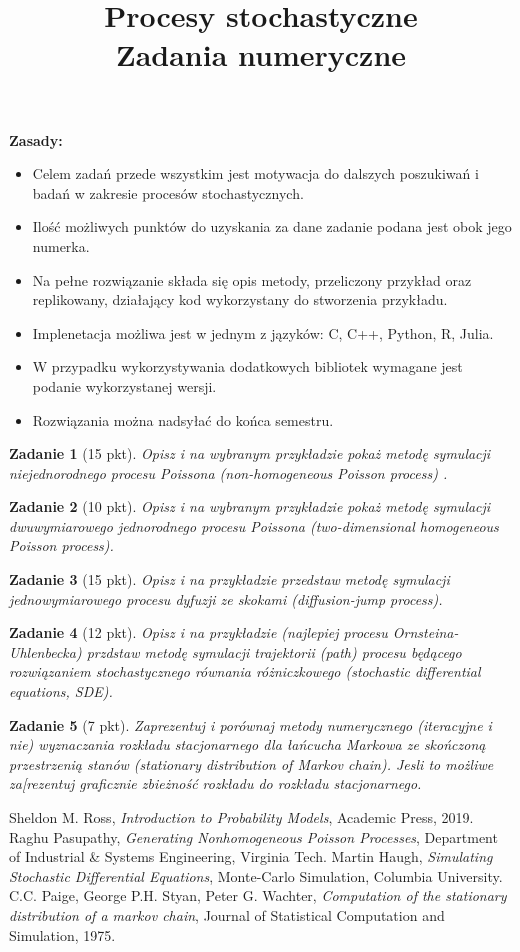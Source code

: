 \documentclass{mwart}
\title{Procesy stochastyczne \\ Zadania numeryczne}
\newtheorem{zd}{Zadanie}
\begin{document}

\maketitle
\textbf{Zasady:}
\begin{itemize}
\item Celem zadań przede wszystkim jest motywacja do dalszych poszukiwań i badań w zakresie procesów stochastycznych.
\item Ilość możliwych punktów do uzyskania za dane zadanie podana jest obok jego numerka.
\item Na pełne rozwiązanie składa się opis metody, przeliczony przykład oraz replikowany, działający kod wykorzystany do stworzenia przykładu.
\item Implenetacja możliwa jest w jednym z jązyków: C, C++, Python, R, Julia.
\item W przypadku wykorzystywania dodatkowych bibliotek wymagane jest podanie wykorzystanej wersji.
\item Rozwiązania można nadsyłać do końca semestru.
\end{itemize}
\begin{zd}[15 pkt]
Opisz i na wybranym przykładzie pokaż metodę symulacji niejednorodnego procesu Poissona (\it{non-homogeneous Poisson process}) .
\end{zd}
\begin{zd}[10 pkt]
Opisz i na wybranym przykładzie pokaż metodę symulacji dwuwymiarowego jednorodnego procesu Poissona (\it{two-dimensional homogeneous Poisson process}).
\end{zd}
\begin{zd}[15 pkt]
Opisz i na przykładzie przedstaw metodę symulacji jednowymiarowego procesu dyfuzji ze skokami (\it{diffusion-jump process}).
\end{zd}
\begin{zd}[12 pkt]
Opisz i na przykładzie (najlepiej procesu Ornsteina- Uhlenbecka) przdstaw metodę symulacji trajektorii (\it{path}) procesu będącego rozwiązaniem stochastycznego równania różniczkowego (\it{stochastic differential equations, SDE}).
\end{zd}
\begin{zd}[7 pkt]
Zaprezentuj i porównaj metody numerycznego (iteracyjne i nie) wyznaczania rozkładu stacjonarnego dla łańcucha Markowa ze skończoną przestrzenią stanów (\it{stationary distribution of Markov chain}). Jesli to możliwe za[rezentuj graficznie zbieżność rozkładu do rozkładu stacjonarnego.
\end{zd}
\begin{thebibliography}{10}
 Sheldon M. Ross, \emph{Introduction to Probability Models}, Academic Press, 2019.
 Raghu Pasupathy, \emph{Generating Nonhomogeneous Poisson Processes}, Department of Industrial \& Systems Engineering, Virginia Tech.
 Martin Haugh, \emph{Simulating Stochastic Differential Equations}, Monte-Carlo Simulation, Columbia University.
 C.C. Paige, George P.H. Styan, Peter G. Wachter, \emph{Computation of the stationary distribution of a markov chain}, Journal of Statistical Computation and Simulation, 1975.
\end{thebibliography}
\end{document}
